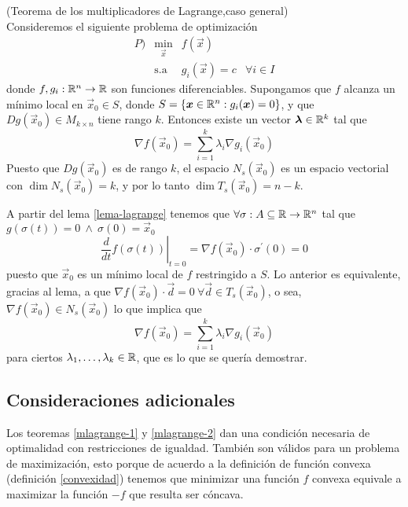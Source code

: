 \begin{teorema}{\rm (Teorema de los multiplicadores de Lagrange,caso general)
}\label{mlagrange-2}
\\Consideremos el siguiente problema de optimizaci\'on
\begin{equation}\label{problema-general-lagrange}
\begin{array}{lclc}
P) & \displaystyle \min_{\vec{x}} 	 & f(\vec{x}) & \\
   & \text{s.a} 			 & g_i(\vec{x})=c & \forall i \in I
\end{array}
\end{equation}
donde $f,g_i:\mathbb{R}^n\to \mathbb{R}$ son funciones diferenciables. Supongamos
que $f$ alcanza un m\'inimo  local en $\vec{x}_0\in S$, donde $S=\{\boldsymbol{x}\in
\mathbb{R}^n : g_i(\boldsymbol{x})=0\}$, y que  $Dg(\vec{x}_0)\in M_{k\times n}$ tiene rango
$k$. Entonces existe un vector $\boldsymbol{\lambda} \in \mathbb{R}^k$ tal que
\[\nabla f(\vec{x}_0)=\sum_{i=1}^k \lambda_i\nabla g_i(\vec{x}_0)\]
Puesto que $Dg(\vec{x}_0)$ es de rango
$k$, el espacio $N_s(\vec{x}_0)$ es un espacio vectorial con $\dim
N_s(\vec{x}_0)=k$, y por lo tanto $\dim T_s(\vec{x}_0)=n-k$.
\end{teorema}

\begin{demostracion}
A partir del lema \ref{lema-lagrange} tenemos que
$\forall\sigma:A\subseteq\mathbb{R}\to\mathbb{R}^n$ tal que
$g(\sigma(t))=0\:\wedge\:\sigma(0)=\vec{x}_0$
\[\left.\frac{d}{dt}f(\sigma(t))\right|_{t=0}=\nabla f(\vec{x}_0)\cdot \sigma^{\prime}(0)=0\]
puesto que $\vec{x}_0$ es un m\'inimo local de $f$ restringido a $S$.
Lo anterior es equivalente, gracias al lema, a que $\nabla
f(\vec{x}_0)\cdot \vec{d}=0\:\forall \vec{d}\in T_s(\vec{x}_0)$, o sea, $\nabla f(\vec{x}_0)\in
N_s(\vec{x}_0)$ lo que implica que
\[\nabla f(\vec{x}_0)=\sum_{i=1}^k\lambda_i\nabla g_i(\vec{x}_0)\]
para ciertos $\lambda_1,\ldots,\lambda_k\in \mathbb{R}$, que es lo que se
quer\'ia demostrar.
\end{demostracion}

\subsection{Consideraciones adicionales}

Los teoremas \ref{mlagrange-1} y \ref{mlagrange-2} dan una condici\'on necesaria de optimalidad con restricciones de igualdad. Tambi\'en son v\'alidos para un problema de maximizaci\'on, esto porque de acuerdo a la definici\'on de funci\'on convexa (definici\'on \ref{convexidad}) tenemos que minimizar una funci\'on $f$ convexa equivale a maximizar la funci\'on $-f$ que resulta ser c\'oncava.

